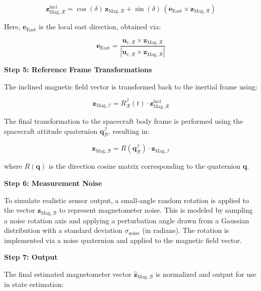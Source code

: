 \begin{equation}
    \mathbf{z}_{\text{Mag},\mathcal{R}}^{\text{incl}} = \cos(\delta)\,\mathbf{z}_{\text{Mag},\mathcal{R}} + \sin(\delta)\,(\mathbf{e}_{\text{East}} \times \mathbf{z}_{\text{Mag},\mathcal{R}})
\end{equation}

Here, $\mathbf{e}_{\text{East}}$ is the local east direction, obtained via:

\begin{equation}
    \mathbf{e}_{\text{East}} = \frac{\mathbf{u}_{r,\mathcal{R}} \times \mathbf{z}_{\text{Mag},\mathcal{R}}}{|\mathbf{u}_{r,\mathcal{R}} \times \mathbf{z}_{\text{Mag},\mathcal{R}}|}
\end{equation}


\textbf{Step 5: Reference Frame Transformations}

The inclined magnetic field vector is transformed back to the inertial frame using:

\begin{equation}
    \mathbf{z}_{\text{Mag},\mathcal{I}} = R_{\mathcal{R}}^{\mathcal{I}}(t) \cdot \mathbf{z}_{\text{Mag},\mathcal{R}}^{\text{incl}}
\end{equation}

The final transformation to the spacecraft body frame is performed using the spacecraft attitude quaternion $\mathbf{q}_{\mathcal{B}}^{\mathcal{I}}$, resulting in:

\begin{equation}
    \mathbf{z}_{\text{Mag},\mathcal{B}} = R(\mathbf{q}_{\mathcal{B}}^{\mathcal{I}}) \cdot \mathbf{z}_{\text{Mag},\mathcal{I}}
\end{equation}

where $R(\mathbf{q})$ is the direction cosine matrix corresponding to the quaternion $\mathbf{q}$.

\textbf{Step 6: Measurement Noise}

To simulate realistic sensor output, a small-angle random rotation is applied to the vector $\mathbf{z}_{\text{Mag},\mathcal{B}}$ to represent magnetometer noise. This is modeled by sampling a noise rotation axis and applying a perturbation angle drawn from a Gaussian distribution with a standard deviation $\sigma_{\text{noise}}$ (in radians). The rotation is implemented via a noise quaternion and applied to the magnetic field vector.

\textbf{Step 7: Output}

The final estimated magnetometer vector $\hat{\mathbf{z}}_{\text{Mag},\mathcal{B}}$ is normalized and output for use in state estimation:

